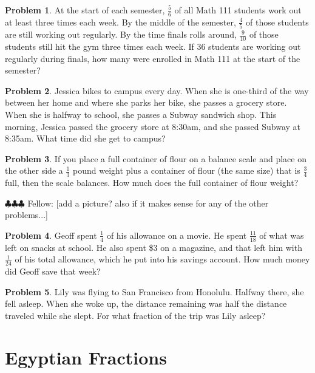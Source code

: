 \documentclass[10pt, reqno]{amsart}
\theoremstyle{remark}
\theoremstyle{definition}
\newtheorem{problem}{Problem}
\numberwithin{equation}{section}  %
\newcommand{\fellow}[1]{{\color{magenta} \sf $\clubsuit\clubsuit\clubsuit$ Fellow: [#1]}}
\begin{document}
\begin{problem}
At the start of each semester, $\frac 5 6$ of all Math 111 students work out at least three times each week.    By the middle of the semester, $\frac 4 5 $ of those students are still working out regularly.  By the time finals rolls around, $\frac 9{10}$ of those students still hit the gym three times each week.  If 36  students are working out regularly during finals, how many were enrolled in Math 111 at the start of the semester?
\end{problem}


\begin{problem}
Jessica bikes to campus every day.  When she is one-third of the way between her home and where she parks her bike, she passes a grocery store.   When she is halfway to school, she passes a Subway sandwich shop.  This morning, Jessica passed the grocery store at 8:30am, and she passed Subway at 8:35am.  What time did she get to campus?
\end{problem}

\begin{problem}
If you place a full container of flour on a balance scale and place on the other side a $\frac 1 3$ pound weight plus a container of flour (the same size) that is $\frac 3 4 $ full, then the scale balances.  How much does the full container of flour weight?

\fellow{add a picture?  also if it makes sense for any of the other problems...}
\end{problem}


\begin{problem}
Geoff spent $\frac 1 4$ of his allowance on a movie.  He spent $\frac{11}{18}$ of what was left on snacks at school.  He also spent \$3 on a magazine, and that left him with $\frac 1{24}$ of his total allowance, which he put into his savings account.  How much money did Geoff save that week?
\end{problem}


\begin{problem}
Lily was flying to San Francisco from Honolulu.  Halfway there, she fell asleep.  When she woke up, the distance remaining was half the distance traveled while she slept.  For what fraction of the trip was Lily asleep?
\end{problem}







\section{Egyptian Fractions}
\end{document}
